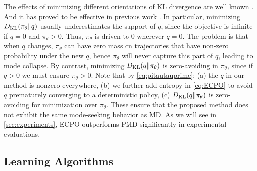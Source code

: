 The effects of minimizing different orientations of KL divergence are
well known \citep{kevin2012machine}. And it has proved
to be effective in previous work \citep{norouzi2016reward,nachum2017improving}.
In particular, minimizing $D_{\mathrm{KL}}(\pi_{\theta}\|q)$
usually underestimates the support of $q$,
since the objective is infinite if $q = 0$ and $\pi_{\theta} > 0$.
Thus, $\pi_\theta$ is driven to $0$ wherever $q=0$.
The problem is that when $q$ changes, $\pi_\theta$ can have zero mass
on trajectories that have non-zero probability under the new $q$,
hence $\pi_\theta$ will never capture this part of $q$,
leading to mode collapse.
By contrast, minimizing $D_{\mathrm{KL}}(q\|\pi_{\theta})$ 
is zero-avoiding in $\pi_{\theta}$,
since if $q > 0$ we must ensure $\pi_{\theta} > 0$.
Note that by \cref{eq:pitautauprime}:
(a) the $q$ in our method is nonzero everywhere,
(b) we further add entropy in \cref{eq:ECPO} to avoid $q$ prematurely converging
to a deterministic policy, 
(c) $D_{\mathrm{KL}}(q\|\pi_{\theta})$ is zero-avoiding for minimization over
$\pi_{\theta}$.
These ensure that the proposed method does not exhibit the same mode-seeking 
behavior as MD.
As we will see in \cref{sec:experiments},
ECPO outperforms PMD significantly in experimental evaluations.

\subsection{Learning Algorithms}

